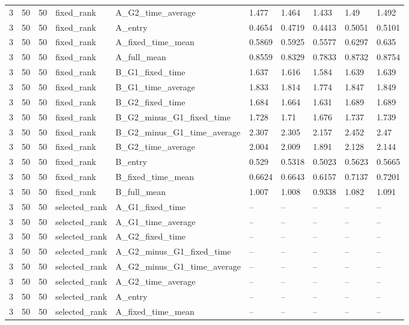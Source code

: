 \begin{longtable}{llllllllll}
3 & 50 & 50 & fixed\_rank & A\_G2\_time\_average & 1.477 & 1.464 & 1.433 & 1.49 & 1.492 \\
3 & 50 & 50 & fixed\_rank & A\_entry & 0.4654 & 0.4719 & 0.4413 & 0.5051 & 0.5101 \\
3 & 50 & 50 & fixed\_rank & A\_fixed\_time\_mean & 0.5869 & 0.5925 & 0.5577 & 0.6297 & 0.635 \\
3 & 50 & 50 & fixed\_rank & A\_full\_mean & 0.8559 & 0.8329 & 0.7833 & 0.8732 & 0.8754 \\
3 & 50 & 50 & fixed\_rank & B\_G1\_fixed\_time & 1.637 & 1.616 & 1.584 & 1.639 & 1.639 \\
3 & 50 & 50 & fixed\_rank & B\_G1\_time\_average & 1.833 & 1.814 & 1.774 & 1.847 & 1.849 \\
3 & 50 & 50 & fixed\_rank & B\_G2\_fixed\_time & 1.684 & 1.664 & 1.631 & 1.689 & 1.689 \\
3 & 50 & 50 & fixed\_rank & B\_G2\_minus\_G1\_fixed\_time & 1.728 & 1.71 & 1.676 & 1.737 & 1.739 \\
3 & 50 & 50 & fixed\_rank & B\_G2\_minus\_G1\_time\_average & 2.307 & 2.305 & 2.157 & 2.452 & 2.47 \\
3 & 50 & 50 & fixed\_rank & B\_G2\_time\_average & 2.004 & 2.009 & 1.891 & 2.128 & 2.144 \\
3 & 50 & 50 & fixed\_rank & B\_entry & 0.529 & 0.5318 & 0.5023 & 0.5623 & 0.5665 \\
3 & 50 & 50 & fixed\_rank & B\_fixed\_time\_mean & 0.6624 & 0.6643 & 0.6157 & 0.7137 & 0.7201 \\
3 & 50 & 50 & fixed\_rank & B\_full\_mean & 1.007 & 1.008 & 0.9338 & 1.082 & 1.091 \\
3 & 50 & 50 & selected\_rank & A\_G1\_fixed\_time & -- & -- & -- & -- & -- \\
3 & 50 & 50 & selected\_rank & A\_G1\_time\_average & -- & -- & -- & -- & -- \\
3 & 50 & 50 & selected\_rank & A\_G2\_fixed\_time & -- & -- & -- & -- & -- \\
3 & 50 & 50 & selected\_rank & A\_G2\_minus\_G1\_fixed\_time & -- & -- & -- & -- & -- \\
3 & 50 & 50 & selected\_rank & A\_G2\_minus\_G1\_time\_average & -- & -- & -- & -- & -- \\
3 & 50 & 50 & selected\_rank & A\_G2\_time\_average & -- & -- & -- & -- & -- \\
3 & 50 & 50 & selected\_rank & A\_entry & -- & -- & -- & -- & -- \\
3 & 50 & 50 & selected\_rank & A\_fixed\_time\_mean & -- & -- & -- & -- & -- \\

\end{longtable}
